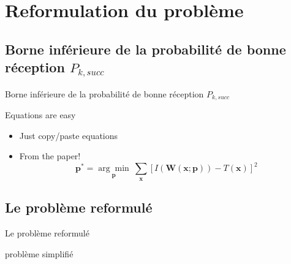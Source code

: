\section{Reformulation du problème}
\subsection{Borne inférieure de la probabilité de bonne réception $P_{k,succ}$}
\begin{frame}{Borne inférieure de la probabilité de bonne réception $P_{k,succ}$}

  Equations are easy
  \begin{itemize}
  \item Just copy/paste equations\pause
  \item From the paper!
    \begin{equation*}
      \textbf{p}^* = \underset{\textbf{p}}{\arg\!\min}~\sum_{\textbf{x}}\left[ I(\textbf{W}(\textbf{x};\textbf{p})) - T(\textbf{x}) \right]^2
    \end{equation*}
  \end{itemize}
\end{frame}


\subsection{Le problème reformulé}
\begin{frame}{Le problème reformulé}

problème simplifié
\end{frame}